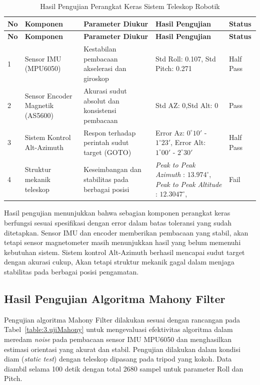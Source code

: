 \begin{longtable}{|p{}|p{}|p{}|p{}|p{}|}
    \caption{Hasil Pengujian Perangkat Keras Sistem Teleskop Robotik}
    \label{table:4.hardware_test} \\
    \hline
    \textbf{No} & \textbf{Komponen} & \textbf{Parameter Diukur} & \textbf{Hasil Pengujian} & \textbf{Status} \\
    \hline
    \endfirsthead
    \hline
    \textbf{No} & \textbf{Komponen} & \textbf{Parameter Diukur} & \textbf{Hasil Pengujian} & \textbf{Status} \\
    \hline
    \endhead
    \hline
    \endfoot
    \hline
    \endlastfoot

    1 & Sensor IMU (MPU6050) & Kestabilan pembacaan akselerasi dan giroskop & Std Roll: 0.107, Std Pitch: 0.271  & Half Pass \\
    \hline
    2 & Sensor Encoder Magnetik (AS5600) & Akurasi sudut absolut dan konsistensi pembacaan & Std AZ: 0,Std Alt: 0& Pass \\
    \hline
    3 & Sistem Kontrol Alt-Azimuth & Respon terhadap perintah sudut target (GOTO) & Error Az: $0^\circ10'$ - $1^\circ23'$, Error Alt: $1^\circ00'$ - $2^\circ30'$  & Half Pass \\
    \hline
    4 & Struktur mekanik teleskop & Keseimbangan dan stabilitas pada berbagai posisi & \textit{Peak to Peak Azimuth} : $13.974^{\circ}$, \textit{Peak to Peak Altitude} : $12.3047^{\circ}$,  & Fail \\
    \hline
\end{longtable}

Hasil pengujian menunjukkan bahwa sebagian komponen perangkat keras berfungsi sesuai spesifikasi dengan error dalam batas toleransi yang sudah ditetapkan. Sensor IMU dan encoder memberikan pembacaan yang stabil, akan tetapi sensor magnetometer masih menunjukkan hasil yang belum memenuhi kebutuhan sistem. Sistem kontrol Alt-Azimuth berhasil mencapai sudut target dengan akurasi cukup, Akan tetapi struktur mekanik gagal dalam menjaga stabilitas pada berbagai posisi pengamatan. \par

\subsection{Hasil Pengujian Algoritma Mahony Filter} \label{IV.UjiMahony}
Pengujian algoritma Mahony Filter dilakukan sesuai dengan rancangan pada Tabel~\ref{table:3.ujiMahony} untuk mengevaluasi efektivitas algoritma dalam meredam \textit{noise} pada pembacaan sensor IMU MPU6050 dan menghasilkan estimasi orientasi yang akurat dan stabil. Pengujian dilakukan dalam kondisi diam (\textit{static test}) dengan teleskop dipasang pada tripod yang kokoh. Data diambil selama 100 detik dengan total 2680 sampel untuk parameter Roll dan Pitch. \par

